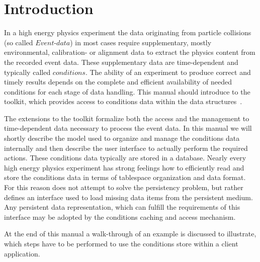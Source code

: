 \documentclass[10pt,a4paper]{article}
\begin{document}
\clearpage
%
%
\tableofcontents
\clearpage
%
%
\setcounter{page}{1}

\section{Introduction}
\label{sec:ddcond-user-manual-introduction}
\noindent
In a high energy physics experiment the data originating from particle 
collisions (so called $Event$-$data$) in most cases require supplementary, 
mostly  environmental, calibration- or alignment data to extract the physics
content from the recorded event data. These supplementary data are 
time-dependent and typically called $conditions$. The ability of an 
experiment to produce correct and timely results depends on the complete 
and efficient availability of  needed conditions for each stage of data 
handling. This manual should introduce to the \DDC toolkit, which provides 
access to conditions data within the \DDH data structures~\cite{bib:dd4hep-manual}.

\noindent
The \DDC extensions to the \DDH toolkit formalize both the access and 
the management to time-dependent data necessary to process the event data.
In this manual we will shortly describe the model used to organize and manage 
the conditions data internally and then describe the user interface to
actually perform the required actions.
These conditions data typically are stored in a database. Nearly every
high energy physics experiment has strong feelings how to efficiently
read and store the conditions data in terms of tablespace organization 
and data format.
For this reason \DDC does not attempt to solve the persistency problem,
but rather defines an interface used to load missing data items from the 
persistent medium. Any persistent data representation, which can fulfill
the requirements of this interface may be adopted by the \DDC 
conditions caching and access mechanism.

\noindent
At the end of this manual a walk-through of an example is discussed to 
illustrate, which steps have to be performed to use the \DDH conditions
store within a client application.
\end{document}
